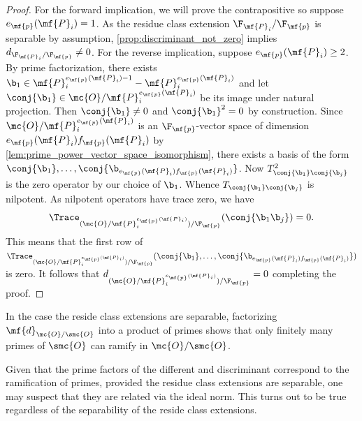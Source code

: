 \documentclass[12pt]{article}
\begin{document}
\begin{proof}
        For the forward implication, we will prove the contrapositive so suppose \(e_{\mf{p}}(\mf{P}_{i}) = 1\). As the residue class extension \(\F_{\mf{P}_{i}}/\F_{\mf{p}}\) is separable by assumption, \cref{prop:discriminant_not_zero} implies \(d_{\F_{\mf{P}_{i}}/\F_{\mf{p}}} \neq 0\). For the reverse implication, suppose \(e_{\mf{p}}(\mf{P}_{i}) \ge 2\). By prime factorization, there exists \(\b_{1} \in \mf{P}_{i}^{e_{\mf{p}}(\mf{P}_{i})-1}-\mf{P}_{i}^{e_{\mf{p}}(\mf{P}_{i})}\) and let \(\conj{\b_{1}} \in \mc{O}/\mf{P}_{i}^{e_{\mf{p}}(\mf{P}_{i})}\) be its image under natural projection. Then \(\conj{\b_{1}} \neq 0\) and \(\conj{\b_{1}}^{2} = 0\) by construction. Since \(\mc{O}/\mf{P}_{i}^{e_{\mf{p}}(\mf{P}_{i})}\) is an \(\F_{\mf{p}}\)-vector space of dimension \(e_{\mf{p}}(\mf{P}_{i})f_{\mf{p}}(\mf{P}_{i})\) by \cref{lem:prime_power_vector_space_isomorphism}, there exists a basis of the form \(\conj{\b_{1}},\ldots,\conj{\b_{e_{\mf{p}}(\mf{P}_{i})f_{\mf{p}}(\mf{P}_{i})}}\). Now \(T_{\conj{\b_{1}}\conj{\b_{j}}}^{2}\) is the zero operator by our choice of \(\b_{1}\). Whence \(T_{\conj{\b_{1}}\conj{\b_{j}}}\) is nilpotent. As nilpotent operators have trace zero, we have
        \[
          \Trace_{(\mc{O}/\mf{P}_{i}^{e_{\mf{p}}(\mf{P}_{i})})/\F_{\mf{p}}}(\conj{\b_{1}\b_{j}}) = 0.
        \]
        This means that the first row of \(\Trace_{(\mc{O}/\mf{P}_{i}^{e_{\mf{p}}(\mf{P}_{i})})/\F_{\mf{p}}}(\conj{\b_{1}},\ldots,\conj{\b_{e_{\mf{p}}(\mf{P}_{i})f_{\mf{p}}(\mf{P}_{i})}})\) is zero. It follows that \(d_{(\mc{O}/\mf{P}_{i}^{e_{\mf{p}}(\mf{P}_{i})})/\F_{\mf{p}}} = 0\) completing the proof.
      \end{proof}

      In the case the reside class extensions are separable, factorizing \(\mf{d}_{\mc{O}/\smc{O}}\) into a product of primes shows that only finitely many primes of \(\smc{O}\) can ramify in \(\mc{O}/\smc{O}\).

      Given that the prime factors of the different and discriminant correspond to the ramification of primes, provided the residue class extensions are separable, one may suspect that they are related via the ideal norm. This turns out to be true regardless of the separability of the reside class extensions.
\end{document}

